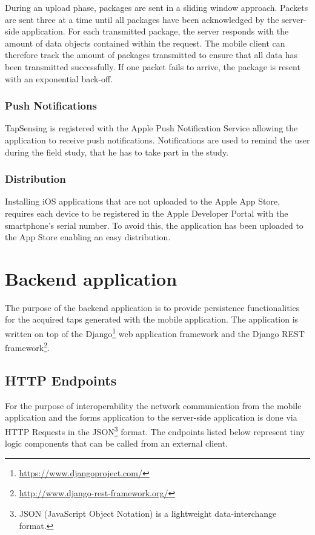 During an upload phase, packages are sent in a sliding window approach. Packets are sent three at a time until all packages have been acknowledged by the server-side application. For each transmitted package, the server responds with the amount of data objects contained within the request. The mobile client can therefore track the amount of packages transmitted to ensure that all data has been transmitted successfully.
If one packet fails to arrive, the package is resent with an exponential back-off.
\subsubsection{Push Notifications}
TapSensing is registered with the Apple Push Notification Service allowing the application to receive push notifications. Notifications are used to remind the user during the field study, that he has to take part in the study.
\subsubsection{Distribution}
Installing iOS applications that are not uploaded to the Apple App Store, requires each device to be registered in the Apple Developer Portal with the smartphone's serial number. To avoid this, the application has been uploaded to the App Store enabling an easy distribution.

\section{Backend application}
The purpose of the backend application is to provide persistence functionalities for the acquired taps generated with the mobile application. The application is written on top of the Django\footnote{\url{https://www.djangoproject.com/}} web application framework and the Django REST framework\footnote{\url{http://www.django-rest-framework.org/}}.

\label{sec:backend}
\subsection{HTTP Endpoints}
\label{sec:endpoints}
For the purpose of interoperability the network communication from the mobile application and the forms application to the server-side application is done via HTTP Requests in the JSON\footnote{JSON (JavaScript Object Notation)\cite{ietf-jsonbis-rfc7159bis-04} is a lightweight data-interchange format.} format. The endpoints listed below represent tiny logic components that can be called from an external client.

